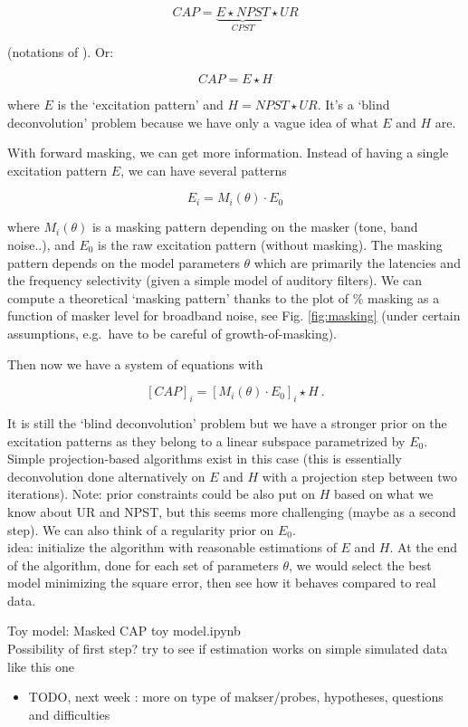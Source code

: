 \documentclass[]{article}
\providecommand{\tightlist}{%
  \setlength{\itemsep}{0pt}\setlength{\parskip}{0pt}}
\begin{document}
\[CAP = \underbrace{E \star NPST}_{CPST} \star UR\]

(notations of \citep{Bappert1980}). Or:

\[CAP = E \star H\]

where \(E\) is the `excitation pattern' and \(H=NPST \star UR\). It's a
`blind deconvolution' problem because we have only a vague idea of what
\(E\) and \(H\) are.

With forward masking, we can get more information. Instead of having a
single excitation pattern \(E\), we can have several patterns

\[E_i = M_i (\theta) \cdot E_0\]

where \(M_i(\theta)\) is a masking pattern depending on the masker
(tone, band noise..), and \(E_0\) is the raw excitation pattern (without
masking). The masking pattern depends on the model parameters \(\theta\)
which are primarily the latencies and the frequency selectivity (given a
simple model of auditory filters). We can compute a theoretical `masking
pattern' thanks to the plot of \% masking as a function of masker level
for broadband noise, see Fig. \ref{fig:masking} (under certain
assumptions, e.g.~have to be careful of growth-of-masking).

Then now we have a system of equations with

\[[CAP]_i = [M_i (\theta) \cdot E_0]_i \star H \ .\]

It is still the `blind deconvolution' problem but we have a stronger
prior on the excitation patterns as they belong to a linear subspace
parametrized by \(E_0\). Simple projection-based algorithms exist in
this case \citep{Yang1994} (this is essentially deconvolution done
alternatively on \(E\) and \(H\) with a projection step between two
iterations). Note: prior constraints could be also put on \(H\) based on
what we know about UR and NPST, but this seems more challenging (maybe
as a second step). We can also think of a regularity prior on \(E_0\).\\
idea: initialize the algorithm with reasonable estimations of \(E\) and
\(H\). At the end of the algorithm, done for each set of parameters
\(\theta\), we would select the best model minimizing the square error,
then see how it behaves compared to real data.

Toy model: Masked CAP toy model.ipynb\\
Possibility of first step? try to see if estimation works on simple
simulated data like this one

\begin{itemize}
\tightlist
\item
  TODO, next week : more on type of makser/probes, hypotheses, questions
  and difficulties
\end{itemize}


\end{document}
